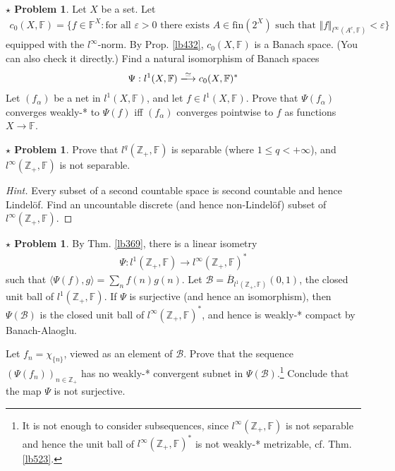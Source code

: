 \documentclass[12pt,b5paper,notitlepage]{article}
\theoremstyle{definition}
\newtheorem{sprob}[prob]{\color{red}$\star$ Problem}
\theoremstyle{plain}
\newcommand{\mc}{\mathcal}
\newcommand{\ovl}{\overline}
\newcommand{\bk}[1]{\langle {#1}\rangle}
\newcommand{\Zbb}{\mathbb Z}
\newcommand{\fin}{\mathrm{fin}}
\newcommand{\Fbb}{\mathbb F}
\newcommand{\eps}{\varepsilon}
\numberwithin{equation}{section}
\begin{document}
\begin{sprob}
Let $X$ be a set. Let
\begin{align*}
c_0(X,\Fbb)=\{f\in\Fbb^X: \text{for all $\eps>0$ there exists $A\in\fin(2^X)$ such that }\Vert f\Vert_{l^\infty(A^c,\Fbb)}<\eps\}
\end{align*}
equipped with the $l^\infty$-norm. By Prop. \ref{lb432}, $c_0(X,\Fbb)$ is a Banach space. (You can also check it directly.) Find a natural isomorphism of Banach spaces
\begin{align}
\Psi:l^1(X,\Fbb)\xlongrightarrow{\simeq} c_0(X,\Fbb)^*
\end{align}
Let $(f_\alpha)$ be a net in $l^1(X,\Fbb)$, and let $f\in l^1(X,\Fbb)$. Prove that $\Psi(f_\alpha)$ converges weakly-* to $\Psi(f)$ iff $(f_\alpha)$ converges pointwise to $f$ as functions $X\rightarrow\Fbb$.
\end{sprob}


\begin{sprob}\label{lb567}
Prove that $l^q(\Zbb_+,\Fbb)$ is separable (where $1\leq q<+\infty$), and $l^\infty(\Zbb_+,\Fbb)$ is not separable.
\end{sprob}

\begin{proof}[Hint]
Every subset of a second countable space is second countable and hence Lindel\"of. Find an uncountable discrete (and hence non-Lindel\"of) subset of $l^\infty(\Zbb_+,\Fbb)$.
\end{proof}



\begin{sprob}\label{lb532}
By Thm. \ref{lb369}, there is a linear isometry 
\begin{gather}
\Psi:l^1(\Zbb_+,\Fbb)\rightarrow l^\infty(\Zbb_+,\Fbb)^*  \label{eq205}
\end{gather}
such that $\bk{\Psi(f),g}=\sum_n f(n)g(n)$. Let $\mc B=\ovl B_{l^1(\Zbb_+,\Fbb)}(0,1)$, the closed unit ball of $l^1(\Zbb_+,\Fbb)$. If $\Psi$ is surjective (and hence an isomorphism), then $\Psi(\mc B)$ is the closed unit ball of $l^\infty(\Zbb_+,\Fbb)^*$, and hence is weakly-* compact by Banach-Alaoglu. 

Let $f_n=\chi_{\{n\}}$, viewed as an element of $\mc B$. Prove that the sequence $(\Psi(f_n))_{n\in\Zbb_+}$ has no weakly-* convergent subnet in $\Psi(\mc B)$.\footnote{It is not enough to consider subsequences, since $l^\infty(\Zbb_+,\Fbb)$ is not separable and hence the unit ball of $l^\infty(\Zbb_+,\Fbb)^*$ is not weakly-* metrizable, cf. Thm. \ref{lb523}.} Conclude that the map $\Psi$ is not surjective.  \hfill\qedsymbol
\end{sprob}
\end{document}
